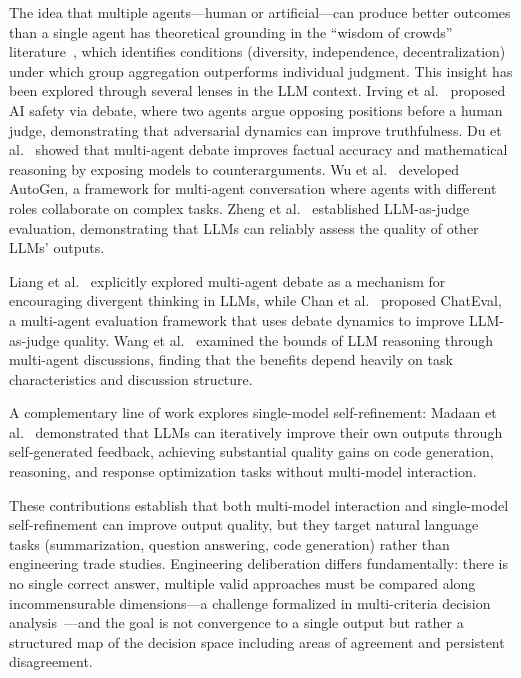 \documentclass[11pt,a4paper]{article}
\begin{document}
The idea that multiple agents---human or artificial---can produce better outcomes than a single agent has theoretical grounding in the ``wisdom of crowds'' literature~\cite{surowiecki2004wisdom}, which identifies conditions (diversity, independence, decentralization) under which group aggregation outperforms individual judgment. This insight has been explored through several lenses in the LLM context. Irving et al.~\cite{irving2018debate} proposed AI safety via debate, where two agents argue opposing positions before a human judge, demonstrating that adversarial dynamics can improve truthfulness. Du et al.~\cite{du2023debate} showed that multi-agent debate improves factual accuracy and mathematical reasoning by exposing models to counterarguments. Wu et al.~\cite{wu2023autogen} developed AutoGen, a framework for multi-agent conversation where agents with different roles collaborate on complex tasks. Zheng et al.~\cite{zheng2024judging} established LLM-as-judge evaluation, demonstrating that LLMs can reliably assess the quality of other LLMs' outputs.

Liang et al.~\cite{liang2024encouraging} explicitly explored multi-agent debate as a mechanism for encouraging divergent thinking in LLMs, while Chan et al.~\cite{chan2024chateval} proposed ChatEval, a multi-agent evaluation framework that uses debate dynamics to improve LLM-as-judge quality. Wang et al.~\cite{wang2024rethinking} examined the bounds of LLM reasoning through multi-agent discussions, finding that the benefits depend heavily on task characteristics and discussion structure.

A complementary line of work explores single-model self-refinement: Madaan et al.~\cite{madaan2023self} demonstrated that LLMs can iteratively improve their own outputs through self-generated feedback, achieving substantial quality gains on code generation, reasoning, and response optimization tasks without multi-model interaction.

These contributions establish that both multi-model interaction and single-model self-refinement can improve output quality, but they target natural language tasks (summarization, question answering, code generation) rather than engineering trade studies. Engineering deliberation differs fundamentally: there is no single correct answer, multiple valid approaches must be compared along incommensurable dimensions---a challenge formalized in multi-criteria decision analysis~\cite{keeney1976decisions}---and the goal is not convergence to a single output but rather a structured map of the decision space including areas of agreement and persistent disagreement.
\end{document}
